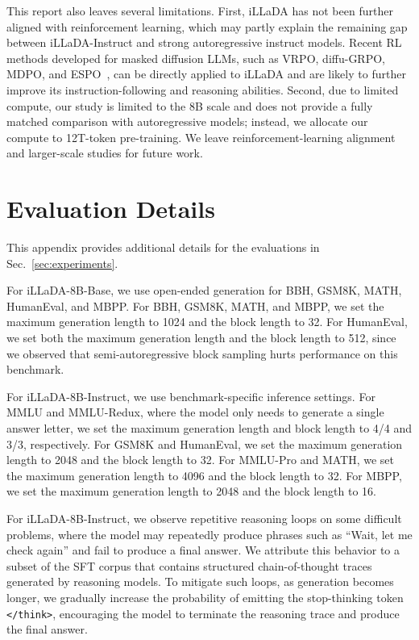 \documentclass[]{bytedance_seed}
\begin{document}
This report also leaves several limitations. First, iLLaDA has not been further aligned with reinforcement learning, which may partly explain the remaining gap between iLLaDA-Instruct and strong autoregressive instruct models. Recent RL methods developed for masked diffusion LLMs, such as VRPO, diffu-GRPO, MDPO, and ESPO~\citep{zhu2025llada,zhao2025d1,he2025mdpo,ou2025principled}, can be directly applied to iLLaDA and are likely to further improve its instruction-following and reasoning abilities. Second, due to limited compute, our study is limited to the 8B scale and does not provide a fully matched comparison with autoregressive models; instead, we allocate our compute to 12T-token pre-training. We leave reinforcement-learning alignment and larger-scale studies for future work.











\newpage
\appendix


\section{Evaluation Details}
\label{app:evaluation}

This appendix provides additional details for the evaluations in Sec.~\ref{sec:experiments}.

For iLLaDA-8B-Base, we use open-ended generation for BBH, GSM8K, MATH, HumanEval, and MBPP. For BBH, GSM8K, MATH, and MBPP, we set the maximum generation length to 1024 and the block length to 32. For HumanEval, we set both the maximum generation length and the block length to 512, since we observed that semi-autoregressive block sampling hurts performance on this benchmark.

For iLLaDA-8B-Instruct, we use benchmark-specific inference settings. For MMLU and MMLU-Redux, where the model only needs to generate a single answer letter, we set the maximum generation length and block length to 4/4 and 3/3, respectively. For GSM8K and HumanEval, we set the maximum generation length to 2048 and the block length to 32. For MMLU-Pro and MATH, we set the maximum generation length to 4096 and the block length to 32. For MBPP, we set the maximum generation length to 2048 and the block length to 16.

For iLLaDA-8B-Instruct, we observe repetitive reasoning loops on some difficult problems, where the model may repeatedly produce phrases such as ``Wait, let me check again'' and fail to produce a final answer. We attribute this behavior to a subset of the SFT corpus that contains structured chain-of-thought traces generated by reasoning models. To mitigate such loops, as generation becomes longer, we gradually increase the probability of emitting the stop-thinking token \texttt{\textless/think\textgreater}, encouraging the model to terminate the reasoning trace and produce the final answer.
\end{document}
